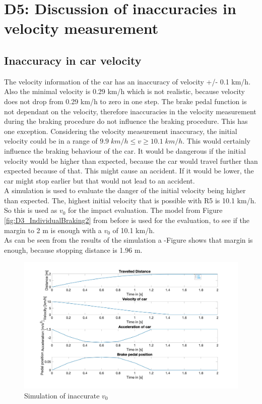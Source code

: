 \chapter{D5: Discussion of inaccuracies in velocity measurement}\label{cha:D5}
\section{Inaccuracy in car velocity}

The velocity information of the car has an inaccuracy of velocity +/- 0.1 km/h.
Also the minimal velocity is 0.29 km/h which is not realistic, because velocity does not drop from 0.29 km/h to zero in one step.
The brake pedal function is not dependant on the velocity, therefore inaccuracies in the velocity measurement during the braking procedure do not influence the braking procedure.
This has one exception.
Considering the velocity measurement inaccuracy, the initial velocity could be in a range of $9.9\; km/h \leq v  \geq 10.1\; km/h$.
This would certainly influence the braking behaviour of the car.
It would be dangerous if the initial velocity would be higher than expected, because the car would travel further than expected because of that.
This might cause an accident.
If it would be lower, the car might stop earlier but that would not lead to an accident.\\
A simulation is used to evaluate the danger of the initial velocity being higher than expected.
The, highest initial velocity that is possible with R5 is 10.1 km/h.
So this is used as $v_0$ for the impact evaluation.
The model from Figure \ref{fig:D3_IndividualBraking2} from before is used for the evaluation, to see if the margin to 2 m is enough with a $v_0$ of 10.1 km/h.\\

As can be seen from the results of the simulation a 
-Figure shows that margin is enough, because stopping distance is 1.96 m.

\begin{figure}[H]
\centering
\includegraphics[width=1\textwidth]{images/D5_result.jpg}
\caption{Simulation of inaccurate $v_0$}
\label{fig:D5_restuls}
\end{figure}




